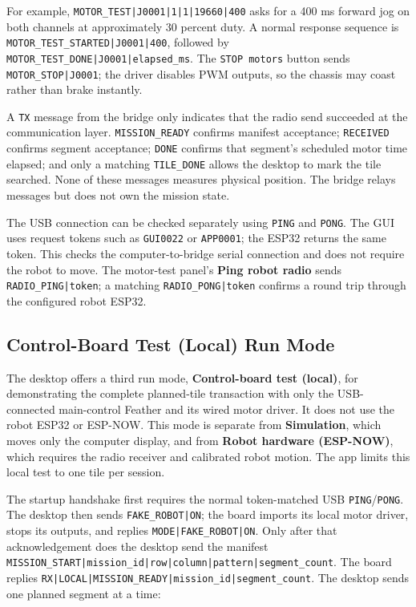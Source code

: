 \documentclass{article}
\begin{document}
For example, \texttt{MOTOR\_TEST|J0001|1|1|19660|400} asks for a 400 ms forward jog on both channels at approximately 30 percent duty. A normal response sequence is \texttt{MOTOR\_TEST\_STARTED|J0001|400}, followed by \texttt{MOTOR\_TEST\_DONE|J0001|elapsed\_ms}. The \texttt{STOP motors} button sends \texttt{MOTOR\_STOP|J0001}; the driver disables PWM outputs, so the chassis may coast rather than brake instantly.

A \texttt{TX} message from the bridge only indicates that the radio send succeeded at the communication layer. \texttt{MISSION\_READY} confirms manifest acceptance; \texttt{RECEIVED} confirms segment acceptance; \texttt{DONE} confirms that segment's scheduled motor time elapsed; and only a matching \texttt{TILE\_DONE} allows the desktop to mark the tile searched. None of these messages measures physical position. The bridge relays messages but does not own the mission state.

The USB connection can be checked separately using \texttt{PING} and \texttt{PONG}. The GUI uses request tokens such as \texttt{GUI0022} or \texttt{APP0001}; the ESP32 returns the same token. This checks the computer-to-bridge serial connection and does not require the robot to move. The motor-test panel's \textbf{Ping robot radio} sends \texttt{RADIO\_PING|token}; a matching \texttt{RADIO\_PONG|token} confirms a round trip through the configured robot ESP32.

\subsection{Control-Board Test (Local) Run Mode}

The desktop offers a third run mode, \textbf{Control-board test (local)}, for demonstrating the complete planned-tile transaction with only the USB-connected main-control Feather and its wired motor driver. It does not use the robot ESP32 or ESP-NOW. This mode is separate from \textbf{Simulation}, which moves only the computer display, and from \textbf{Robot hardware (ESP-NOW)}, which requires the radio receiver and calibrated robot motion. The app limits this local test to one tile per session.

The startup handshake first requires the normal token-matched USB \texttt{PING}/\texttt{PONG}. The desktop then sends \texttt{FAKE\_ROBOT|ON}; the board imports its local motor driver, stops its outputs, and replies \texttt{MODE|FAKE\_ROBOT|ON}. Only after that acknowledgement does the desktop send the manifest \texttt{MISSION\_START|mission\_id|row|column|pattern|segment\_count}. The board replies \texttt{RX|LOCAL|MISSION\_READY|mission\_id|segment\_count}. The desktop sends one planned segment at a time:
\end{document}
